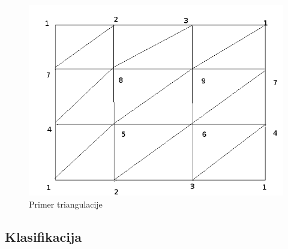 \documentclass{article}
\begin{document}
\begin{figure}
\begin{center}
\includegraphics[scale=0.35]{Triangulation.png}
\caption{Primer triangulacije}
\end{center}
\label{triangulacija}
\end{figure}

\subsection{Klasifikacija}


\end{document}
